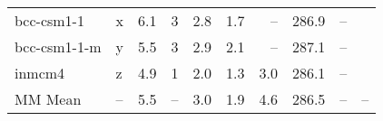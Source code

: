 \begin{table}
\begin{tabular}{llrrrrrrrl}
bcc-csm1-1    &   x &   6.1 &                       3 &  2.8 &  1.7 &    -- &  286.9 &                   -- &  \citet{stocker2013ipcc} \\
bcc-csm1-1-m  &   y &   5.5 &                       3 &  2.9 &  2.1 &    -- &  287.1 &                   -- &  \citet{stocker2013ipcc} \\
inmcm4        &   z &   4.9 &                       1 &  2.0 &  1.3 &   3.0 &  286.1 &                   -- &     \citet{gregory15tcr} \\
MM Mean       &  -- &   5.5 &                    -- &  3.0 &  1.9 &   4.6 &  286.5 &                   -- &                       -- \\
\bottomrule
\end{tabular}
\end{table}

